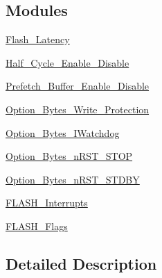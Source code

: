\subsection*{Modules}
\begin{DoxyCompactItemize}
\item 
\hyperlink{group___flash___latency}{Flash\+\_\+\+Latency}
\item 
\hyperlink{group___half___cycle___enable___disable}{Half\+\_\+\+Cycle\+\_\+\+Enable\+\_\+\+Disable}
\item 
\hyperlink{group___prefetch___buffer___enable___disable}{Prefetch\+\_\+\+Buffer\+\_\+\+Enable\+\_\+\+Disable}
\item 
\hyperlink{group___option___bytes___write___protection}{Option\+\_\+\+Bytes\+\_\+\+Write\+\_\+\+Protection}
\item 
\hyperlink{group___option___bytes___i_watchdog}{Option\+\_\+\+Bytes\+\_\+\+I\+Watchdog}
\item 
\hyperlink{group___option___bytes__n_r_s_t___s_t_o_p}{Option\+\_\+\+Bytes\+\_\+n\+R\+S\+T\+\_\+\+S\+T\+OP}
\item 
\hyperlink{group___option___bytes__n_r_s_t___s_t_d_b_y}{Option\+\_\+\+Bytes\+\_\+n\+R\+S\+T\+\_\+\+S\+T\+D\+BY}
\item 
\hyperlink{group___f_l_a_s_h___interrupts}{F\+L\+A\+S\+H\+\_\+\+Interrupts}
\item 
\hyperlink{group___f_l_a_s_h___flags}{F\+L\+A\+S\+H\+\_\+\+Flags}
\end{DoxyCompactItemize}


\subsection{Detailed Description}
